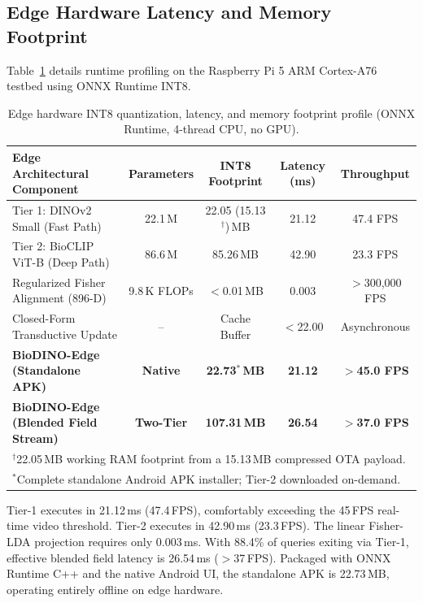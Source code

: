 \documentclass[a4paper,fleqn,nologo]{cas-dc}
\begin{document}
\subsection{Edge Hardware Latency and Memory Footprint}
\label{sec:hardware_bench}
Table~\ref{tab:edge_bench} details runtime profiling on the Raspberry Pi 5 ARM Cortex-A76 testbed using ONNX Runtime INT8.

\begin{table}[htbp]
\centering
\caption{Edge hardware INT8 quantization, latency, and memory footprint profile (ONNX Runtime, 4-thread CPU, no GPU).}
\label{tab:edge_bench}
\small
\begin{tabularx}{\textwidth}{lcccc}
\toprule
\textbf{Edge Architectural Component} & \textbf{Parameters} & \textbf{INT8 Footprint} & \textbf{Latency (ms)} & \textbf{Throughput} \\
\midrule
Tier 1: DINOv2 Small (Fast Path) & 22.1\,M & 22.05 (15.13$^\dagger$)\,MB & 21.12 & 47.4 FPS \\
Tier 2: BioCLIP ViT-B (Deep Path) & 86.6\,M & 85.26\,MB & 42.90 & 23.3 FPS \\
Regularized Fisher Alignment (896-D) & 9.8\,K FLOPs & $<$0.01\,MB & 0.003 & $>$300,000 FPS \\
Closed-Form Transductive Update & -- & Cache Buffer & $<$22.00 & Asynchronous \\
\midrule
\textbf{BioDINO-Edge (Standalone APK)} & \textbf{Native} & \textbf{22.73$^*$\,MB} & \textbf{21.12} & \textbf{$>$45.0 FPS} \\
\textbf{BioDINO-Edge (Blended Field Stream)} & \textbf{Two-Tier} & \textbf{107.31\,MB} & \textbf{26.54} & \textbf{$>$37.0 FPS} \\
\bottomrule
\multicolumn{5}{l}{\footnotesize $^\dagger$22.05\,MB working RAM footprint from a 15.13\,MB compressed OTA payload.} \\
\multicolumn{5}{l}{\footnotesize $^*$Complete standalone Android APK installer; Tier-2 downloaded on-demand.}
\end{tabularx}
\end{table}

Tier-1 executes in 21.12\,ms (47.4\,FPS), comfortably exceeding the 45\,FPS real-time video threshold. Tier-2 executes in 42.90\,ms (23.3\,FPS). The linear Fisher-LDA projection requires only 0.003\,ms. With 88.4\% of queries exiting via Tier-1, effective blended field latency is 26.54\,ms ($>$37\,FPS). Packaged with ONNX Runtime C++ and the native Android UI, the standalone APK is 22.73\,MB, operating entirely offline on edge hardware.
\end{document}

